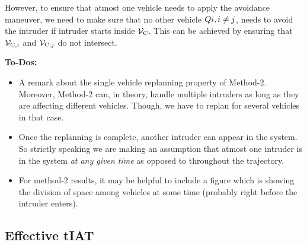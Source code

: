 However, to ensure that atmost one vehicle needs to apply the avoidance maneuver, we need to make sure that no other vehicle $Q{i}, i \neq j$, needs to avoid the intruder if intruder starts inside $\mathcal{V}_\text{C}$. This can  be achieved by ensuring that $\mathcal{V}_{\text{C},i}$ and $\mathcal{V}_{\text{C},j}$ do not intersect.

\textbf{To-Dos:}
\begin{itemize}
\item A remark about the single vehicle replanning property of Method-2. Moreover, Method-2 can, in theory, handle multiple intruders as long as they are affecting different vehicles. Though, we have to replan for several vehicles in that case. 
\item Once the replanning is complete, another intruder can appear in the system. So strictly speaking we are making an assumption that atmost one intruder is in the system \textit{at any given time} as opposed to throughout the trajectory.
\item For method-2 results, it may be helpful to include a figure which is showing the division of space among vehicles at some time (probably right before the intruder enters). 
\end{itemize}

\subsection{Effective tIAT}